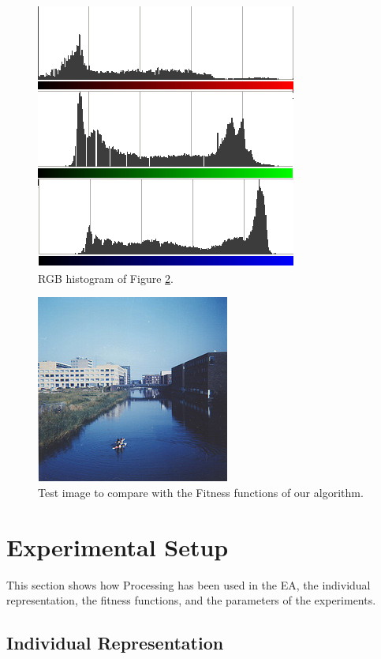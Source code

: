 \begin{figure}
\centering
   \includegraphics[scale =0.6] {gfx/art/histogram.png}
\caption{RGB histogram of Figure \ref{fig:flevopark}. }
\label{fig:histogram}
\end{figure}

\begin{figure}
\centering
   \includegraphics[scale =3] {gfx/art/flevopark.jpg}
\caption{Test image to compare with the Fitness functions of our algorithm.}
\label{fig:flevopark}
\end{figure}

\section{Experimental Setup}
\label{sec:setup}

\noindent This section shows how Processing has been used in the EA, the individual representation, the fitness functions, and the parameters of the experiments.



\subsection{Individual Representation}

